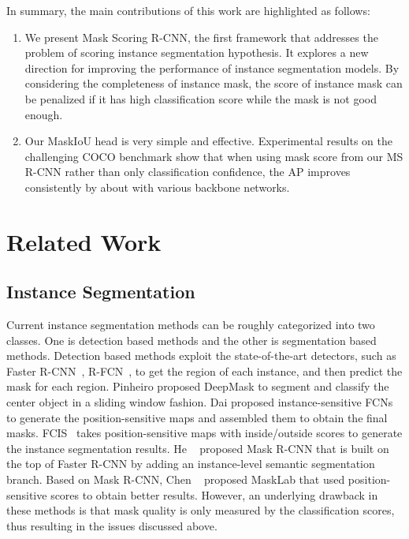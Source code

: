 \documentclass[10pt,twocolumn,letterpaper]{article}
\begin{document}
    In summary, the main contributions of this work are highlighted as follows:
    \begin{enumerate}
    \item We present Mask Scoring R-CNN, the first framework that addresses the problem of scoring instance segmentation hypothesis. It explores a new direction for improving the performance of instance segmentation models. By considering the completeness of instance mask, the score of instance mask can be penalized if it has high classification score while the mask is not good enough. 
\item Our MaskIoU head is very simple and effective. Experimental results on the challenging COCO benchmark show that when using mask score from our MS R-CNN rather than only classification confidence, the AP improves consistently by about  with various backbone networks.
\end{enumerate}
   


    





    

    
    




    
    




\section{Related Work}

\subsection{Instance Segmentation}


    Current instance segmentation methods can be roughly categorized into two classes. One is detection based methods and the other is segmentation based methods. Detection based methods exploit the state-of-the-art detectors, such as Faster R-CNN~\cite{ren2015faster}, R-FCN~\cite{dai2016rfcn}, to get the region of each instance, and then predict the mask for each region.
    Pinheiro \etal \cite{deepmask} proposed DeepMask to segment and classify the center object in a sliding window fashion.
    Dai \etal \cite{dai2016instance-sensitiveFCN} proposed instance-sensitive FCNs to generate the position-sensitive maps and assembled them to obtain the final masks. 
    FCIS~\cite{fcis} takes position-sensitive maps with inside/outside scores to generate the instance segmentation results.
    He \etal~\cite{he2017maskrcnn} proposed Mask R-CNN that is built on the top of Faster R-CNN by adding an instance-level semantic segmentation branch. Based on Mask R-CNN, Chen \etal~\cite{chen2017masklab} proposed MaskLab that used position-sensitive scores to obtain better results. However, an underlying drawback in these methods is that mask quality is only measured by the classification scores, thus resulting in the issues discussed above.
    
\end{document}
